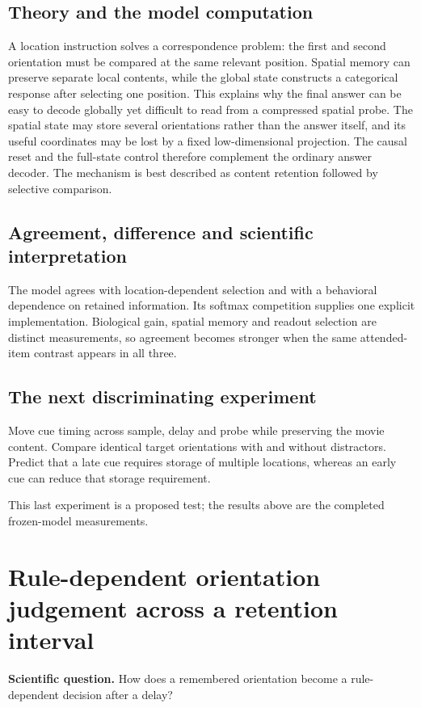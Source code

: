 \documentclass[11pt]{article}
\begin{document}
\subsection{Theory and the model computation}
A location instruction solves a correspondence problem: the first and second orientation must be compared at the same relevant position. Spatial memory can preserve separate local contents, while the global state constructs a categorical response after selecting one position. This explains why the final answer can be easy to decode globally yet difficult to read from a compressed spatial probe. The spatial state may store several orientations rather than the answer itself, and its useful coordinates may be lost by a fixed low-dimensional projection. The causal reset and the full-state control therefore complement the ordinary answer decoder. The mechanism is best described as content retention followed by selective comparison.

\subsection{Agreement, difference and scientific interpretation}
The model agrees with location-dependent selection and with a behavioral dependence on retained information. Its softmax competition supplies one explicit implementation. Biological gain, spatial memory and readout selection are distinct measurements, so agreement becomes stronger when the same attended-item contrast appears in all three.

\subsection{The next discriminating experiment}
Move cue timing across sample, delay and probe while preserving the movie content. Compare identical target orientations with and without distractors. Predict that a late cue requires storage of multiple locations, whereas an early cue can reduce that storage requirement.

This last experiment is a proposed test; the results above are the completed frozen-model measurements.
\clearpage\section{Rule-dependent orientation judgement across a retention interval}
\textbf{Scientific question.} How does a remembered orientation become a rule-dependent decision after a delay?
\end{document}
